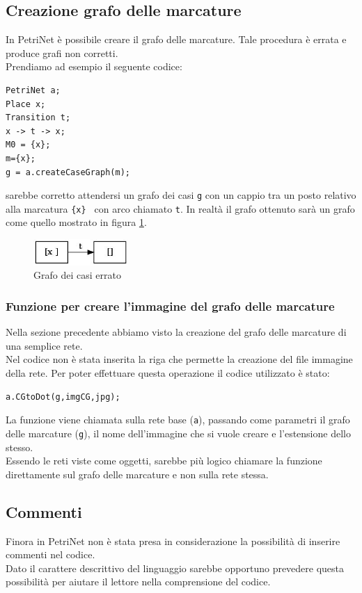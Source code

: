 \documentclass[italian,12pt]{book}
\begin{document}
\subsection{Creazione grafo delle marcature}\label{analisi:grafo}
In PetriNet è possibile creare il grafo delle marcature. Tale procedura è errata e produce 
grafi non corretti. \\
Prendiamo ad esempio il seguente codice:
\begin{verbatim}PetriNet a;
Place x;
Transition t;
x -> t -> x;
M0 = {x};
m={x};
g = a.createCaseGraph(m);
\end{verbatim}
sarebbe corretto attendersi un grafo dei casi {\tt g} con un cappio tra un posto relativo alla marcatura 
{\tt \{x\} } con arco chiamato {\tt t}. In realtà il grafo ottenuto sarà un grafo come quello mostrato
in figura \ref{fig:err_grafo_casi_1}.
\begin{figure}[htb]
\centerline{\includegraphics[height=1cm]{img/CG1.jpg}}
\caption{Grafo dei casi errato}\label{fig:err_grafo_casi_1}
\end{figure}

\subsubsection{Funzione per creare l'immagine del grafo delle marcature}
Nella sezione precedente abbiamo visto la creazione del grafo delle marcature di una semplice rete. \\
Nel codice non è stata inserita la riga che permette la creazione del file immagine della rete. Per poter
effettuare questa operazione il codice utilizzato è stato: \begin{verbatim}a.CGtoDot(g,imgCG,jpg);\end{verbatim}
La funzione viene chiamata sulla rete base ({\tt a}), passando come parametri il grafo delle marcature ({\tt g}), 
il nome dell'immagine che si vuole creare e l'estensione dello stesso.\\
Essendo le reti viste come oggetti, sarebbe più logico chiamare la funzione direttamente sul grafo delle 
marcature e non sulla rete stessa.

\subsection{Commenti}
Finora in PetriNet non è stata presa in considerazione la possibilità di inserire commenti
nel codice.\\
Dato il carattere descrittivo del linguaggio sarebbe opportuno prevedere questa possibilità
per aiutare il lettore nella comprensione del codice.
\end{document}
